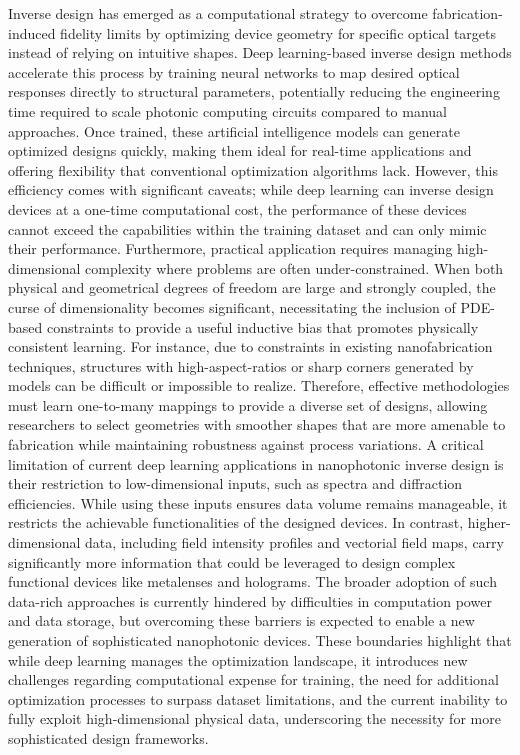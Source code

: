 Inverse design has emerged as a computational strategy to overcome fabrication-induced fidelity limits by optimizing device geometry for specific optical targets instead of relying on intuitive shapes. \citep{doi_10_48550_arxiv_2506_21748_dc49c062} \citep{doi_10_1039_d4nr03081h_5c44e89e} Deep learning-based inverse design methods accelerate this process by training neural networks to map desired optical responses directly to structural parameters, potentially reducing the engineering time required to scale photonic computing circuits compared to manual approaches. \citep{doi_10_1117_12_3092203_3c6166cd} \citep{doi_10_1088_2040_8986_ae709e_8af9beda} Once trained, these artificial intelligence models can generate optimized designs quickly, making them ideal for real-time applications and offering flexibility that conventional optimization algorithms lack. However, this efficiency comes with significant caveats; while deep learning can inverse design devices at a one-time computational cost, the performance of these devices cannot exceed the capabilities within the training dataset and can only mimic their performance. Furthermore, practical application requires managing high-dimensional complexity where problems are often under-constrained. When both physical and geometrical degrees of freedom are large and strongly coupled, the curse of dimensionality becomes significant, necessitating the inclusion of PDE-based constraints to provide a useful inductive bias that promotes physically consistent learning. For instance, due to constraints in existing nanofabrication techniques, structures with high-aspect-ratios or sharp corners generated by models can be difficult or impossible to realize. Therefore, effective methodologies must learn one-to-many mappings to provide a diverse set of designs, allowing researchers to select geometries with smoother shapes that are more amenable to fabrication while maintaining robustness against process variations. A critical limitation of current deep learning applications in nanophotonic inverse design is their restriction to low-dimensional inputs, such as spectra and diffraction efficiencies. While using these inputs ensures data volume remains manageable, it restricts the achievable functionalities of the designed devices. In contrast, higher-dimensional data, including field intensity profiles and vectorial field maps, carry significantly more information that could be leveraged to design complex functional devices like metalenses and holograms. The broader adoption of such data-rich approaches is currently hindered by difficulties in computation power and data storage, but overcoming these barriers is expected to enable a new generation of sophisticated nanophotonic devices. These boundaries highlight that while deep learning manages the optimization landscape, it introduces new challenges regarding computational expense for training, the need for additional optimization processes to surpass dataset limitations, and the current inability to fully exploit high-dimensional physical data, underscoring the necessity for more sophisticated design frameworks. \citep{doi_10_1515_nanoph_2024_0536_4b6631ba} \citep{doi_10_29026_oes_2022_210012_27973a69} \citep{doi_10_1002_adom_202502062_d73a85e1} \citep{doi_10_1515_nanoph_2018_0183_d85e9193}


